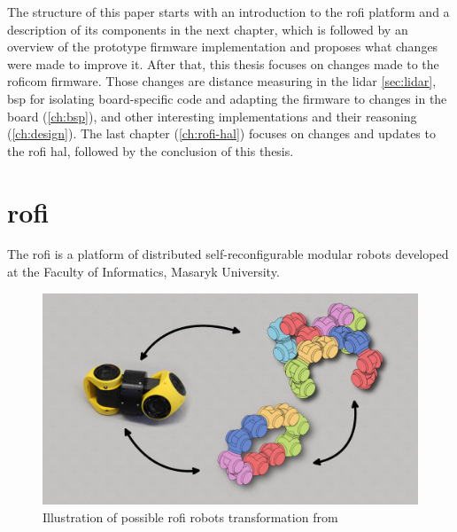 \documentclass[
  digital,     %
  oneside,     %
  nosansbold,  %
  nocolorbold, %
  nolof,         %
  nolot,         %
]{fithesis4}
\newcommand{\TODO}[1]{#1} %
\newcommand{\TODOLIST}[1]{}
\begin{document}
The structure of this paper starts with an introduction to the \acrshort{rofi} platform and a
description of its components in the next chapter, which is followed by an overview of the prototype
firmware implementation and proposes what changes were made to improve it. After that, this thesis
focuses on changes made to the \acrshort{roficom} firmware. Those changes are distance measuring in
the \acrshort{lidar} \autoref{sec:lidar}, \acrlong{bsp} for isolating board-specific code and
adapting the firmware to changes in the board (\autoref{ch:bsp}), and other interesting
implementations and their reasoning (\autoref{ch:design}). The last chapter (\autoref{ch:rofi-hal})
focuses on changes and updates to the \acrshort{rofi} \acrlong{hal}, followed by the conclusion of
this thesis.

\chapter[ RoFI ]{ \acrshort{rofi} }
\TODOLIST{
\begin{itemize}
    \item Describe the platform
    \item Universal module
\end{itemize}
}

The \acrshort{rofi} is a platform of distributed self-reconfigurable modular robots developed at the
Faculty of Informatics, Masaryk University.

\begin{figure}
    \includegraphics[width=\textwidth,height=\textheight,keepaspectratio]{assets/rofiTransformation.jpg}
    \caption[\acrshort{rofi} transformation]{Illustration of possible \acrshort{rofi} robots transformation from \cite{rofiweb}}
    \label{fig:rofi-transformation}
\end{figure}
\end{document}
